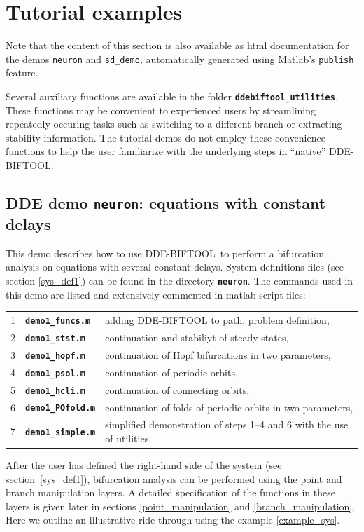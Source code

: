 \documentclass[10pt]{scrartcl}
\newcommand{\DDEBIFCODE}{\textsc{DDE-BIFTOOL}}
\newcommand{\file}[1]{\textbf{\texttt{#1}}}
\newcommand{\blist}[1]{\mbox{\lstinline!#1!}}
\begin{document}
\iffalse
\section{Tutorial examples}\label{demo}
Note that the content of this section is also available as html
documentation for the demos \blist{neuron} and \blist{sd_demo},
automatically generated using Matlab's \texttt{publish} feature.

Several auxiliary functions are available in the folder
\file{ddebiftool\_utilities}. These functions may be convenient to
experienced users by streamlining repeatedly occuring tasks such as
switching to a different branch or extracting stability
information. The tutorial demos do not employ these convenience
functions  to help the user familiarize with the underlying steps in ``native'' \DDEBIFCODE.
\subsection{DDE demo \file{neuron}: equations with constant delays}
\label{ride-through}
This demo describes how to use \DDEBIFCODE\ to perform a bifurcation
analysis on equations with several constant delays.  System
definitions files (see section \ref{sys_def1}) can be found in the
directory \file{neuron}.  The commands used in this demo are listed
and extensively commented in matlab script files:\\
\begin{center}
  \begin{tabular}[t]{rll}
    1 & \file{demo1\_funcs.m} &adding \DDEBIFCODE{} to path, problem definition,\\
    2 & \file{demo1\_stst.m} & continuation and stabiliyt of steady states,\\
    3 & \file{demo1\_hopf.m}& continuation of Hopf bifurcations in two parameters,\\
    4 & \file{demo1\_psol.m} & continuation of periodic orbits,\\[0.5ex]
    5&  \file{demo1\_hcli.m}& continuation of connecting orbits,\\
    6 & \file{demo1\_POfold.m}& continuation of folds of periodic orbits in two 
    parameters,\\
    7 & \file{demo1\_simple.m} & simplified demonstration of steps 1--4 and 6 with the use of utilities.
  \end{tabular}
\end{center}
  
After the user has defined the right-hand side of the system (see
section~\ref{sys_def1}), bifurcation analysis can be performed using
the point and branch manipulation layers. A detailed specification of
the functions in these layers is given later in sections
\ref{point_manipulation} and \ref{branch_manipulation}.  Here
we outline an illustrative ride-through using the example
\eqref{example_sys}.
\end{document}
